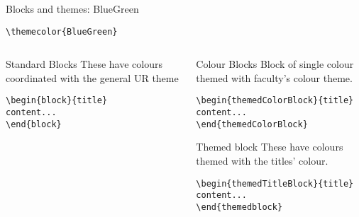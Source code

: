 \begingroup
{}
\begin{frame}[fragile]{Blocks and themes: BlueGreen}
    \begin{center}\verb|\themecolor{BlueGreen}|\end{center}
\begin{columns} %
\begin{column}{0.3\textwidth}
\begin{block}{Standard Blocks}
These have colours coordinated with the general UR theme
\begin{verbatim}
\begin{block}{title}
content...
\end{block}
\end{verbatim}
\end{block}
\end{column}
\begin{column}{0.7\textwidth}
\begin{themedColorBlock}{Colour Blocks}
Block of single colour themed with faculty's colour theme.
\small
\begin{verbatim}
\begin{themedColorBlock}{title}
content...
\end{themedColorBlock}
\end{verbatim}
\end{themedColorBlock}
\begin{themedTitleBlock} {Themed block}
These have colours themed with the titles' colour.
\small
\begin{verbatim}
\begin{themedTitleBlock}{title}
content...
\end{themedblock}
\end{verbatim}
\end{themedTitleBlock}
\end{column}
\end{columns}
\end{frame}
\endgroup


